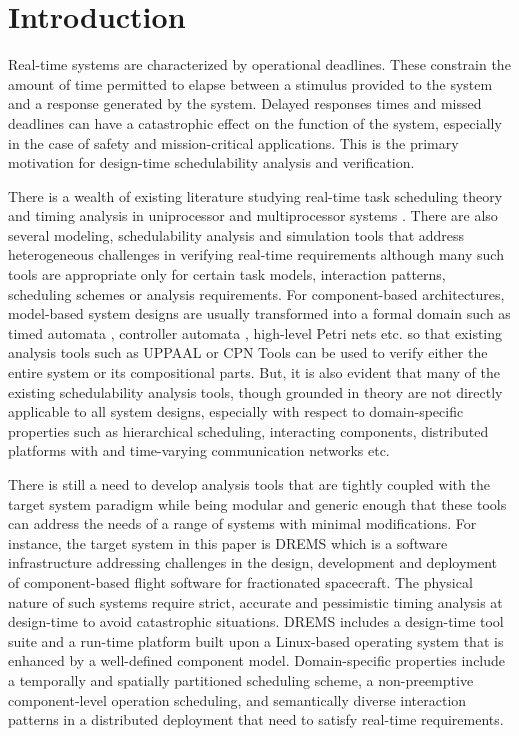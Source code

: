 \section{Introduction}

Real-time systems are characterized by operational deadlines. These constrain the amount of time permitted to elapse between a stimulus provided to the system and a response generated by the system. Delayed responses times and missed deadlines can have a catastrophic effect on the function of the system, especially in the case of safety and mission-critical applications. This is the primary motivation for design-time schedulability analysis and verification. 

There is a wealth of existing literature studying real-time task scheduling theory and timing analysis in uniprocessor and multiprocessor systems \cite{Audsley1995, Sha2004}. There are also several modeling, schedulability analysis and simulation tools \cite{MAST1, Cheddar, TIMES, PTIDES} that address heterogeneous challenges in verifying real-time requirements although many such tools are appropriate only for certain task models, interaction patterns, scheduling schemes or analysis requirements. For component-based architectures, model-based system designs are usually transformed into a formal domain such as timed automata \cite{Alur1994, Macariu2010}, controller automata \cite{Zhang2012}, high-level Petri nets \cite{masri2009} etc. so that existing analysis tools such as UPPAAL \cite{UPPAAL} or CPN Tools \cite{CPNTools} can be used to verify either the entire system or its compositional parts. But, it is also evident that many of the existing schedulability analysis tools, though grounded in theory are not directly applicable to all system designs, especially with respect to domain-specific properties such as hierarchical scheduling, interacting components, distributed platforms with and time-varying communication networks etc. 

There is still a need to develop analysis tools that are tightly coupled with the target system paradigm while being modular and generic enough that these tools can address the needs of a range of systems with minimal modifications. For instance, the target system in this paper is DREMS \cite{DREMS13Software} which is a software infrastructure addressing challenges in the design, development and deployment of component-based flight software for fractionated spacecraft. The physical nature of such systems require strict, accurate and pessimistic timing analysis at design-time to avoid catastrophic situations. DREMS includes a design-time tool suite and a run-time platform built upon a Linux-based operating system that is enhanced by a well-defined component model. Domain-specific properties include a temporally and spatially partitioned scheduling scheme, a non-preemptive component-level operation scheduling, and semantically diverse interaction patterns in a distributed deployment that need to satisfy real-time requirements. 

